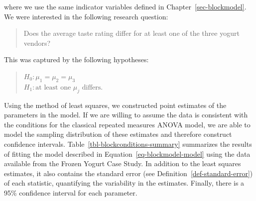 \documentclass[
  letterpaper,
  DIV=11,
  numbers=noendperiod]{scrreprt}
\theoremstyle{definition}
\theoremstyle{definition}
\theoremstyle{plain}
\theoremstyle{remark}
\begin{document}
where we use the same indicator variables defined in
Chapter~\ref{sec-blockmodel}. We were interested in the following
research question:

\begin{quote}
Does the average taste rating differ for at least one of the three
yogurt vendors?
\end{quote}

This was captured by the following hypotheses:

\begin{quote}
\(H_0: \mu_1 = \mu_2 = \mu_3\)\\
\(H_1: \text{at least one } \mu_j \text{ differs}.\)
\end{quote}

Using the method of least squares, we constructed point estimates of the
parameters in the model. If we are willing to assume the data is
consistent with the conditions for the classical repeated measures ANOVA
model, we are able to model the sampling distribution of these estimates
and therefore construct confidence intervals.
Table~\ref{tbl-blockconditions-summary} summarizes the results of
fitting the model described in Equation~\ref{eq-blockmodel-model} using
the data available from the Frozen Yogurt Case Study. In addition to the
least squares estimates, it also contains the standard error (see
Definition~\ref{def-standard-error}) of each statistic, quantifying the
variability in the estimates. Finally, there is a 95\% confidence
interval for each parameter.
\end{document}

